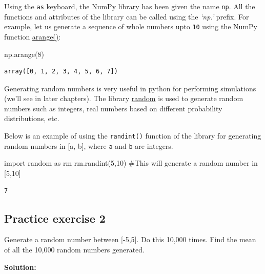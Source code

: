 \documentclass[
  letterpaper,
  DIV=11,
  numbers=noendperiod]{scrreprt}
\newenvironment{Shaded}{\begin{snugshade}}{\end{snugshade}}
\newcommand{\CommentTok}[1]{\textcolor[rgb]{0.37,0.37,0.37}{#1}}
\newcommand{\DecValTok}[1]{\textcolor[rgb]{0.68,0.00,0.00}{#1}}
\newcommand{\ImportTok}[1]{\textcolor[rgb]{0.00,0.46,0.62}{#1}}
\newcommand{\NormalTok}[1]{\textcolor[rgb]{0.00,0.23,0.31}{#1}}
\begin{document}
Using the \texttt{as} keyboard, the NumPy library has been given the
name \texttt{np}. All the functions and attributes of the library can be
called using the \emph{`np.'} prefix. For example, let us generate a
sequence of whole numbers upto \texttt{10} using the NumPy function
\href{https://numpy.org/doc/stable/reference/generated/numpy.arange.html}{arange()}:

\begin{Shaded}
\begin{Highlighting}[]
\NormalTok{np.arange(}\DecValTok{8}\NormalTok{)}
\end{Highlighting}
\end{Shaded}

\begin{verbatim}
array([0, 1, 2, 3, 4, 5, 6, 7])
\end{verbatim}

Generating random numbers is very useful in python for performing
simulations (we'll see in later chapters). The library
\href{https://docs.python.org/3/library/random.html}{random} is used to
generate random numbers such as integers, real numbers based on
different probability distributions, etc.

Below is an example of using the \texttt{randint()} function of the
library for generating random numbers in {[}a, b{]}, where \texttt{a}
and \texttt{b} are integers.

\begin{Shaded}
\begin{Highlighting}[]
\ImportTok{import}\NormalTok{ random }\ImportTok{as}\NormalTok{ rm}
\NormalTok{rm.randint(}\DecValTok{5}\NormalTok{,}\DecValTok{10}\NormalTok{) }\CommentTok{\#This will generate a random number in [5,10]}
\end{Highlighting}
\end{Shaded}

\begin{verbatim}
7
\end{verbatim}

\hypertarget{practice-exercise-2-2}{%
\subsection{Practice exercise 2}\label{practice-exercise-2-2}}

Generate a random number between {[}-5,5{]}. Do this 10,000 times. Find
the mean of all the 10,000 random numbers generated.

\textbf{Solution:}
\end{document}
